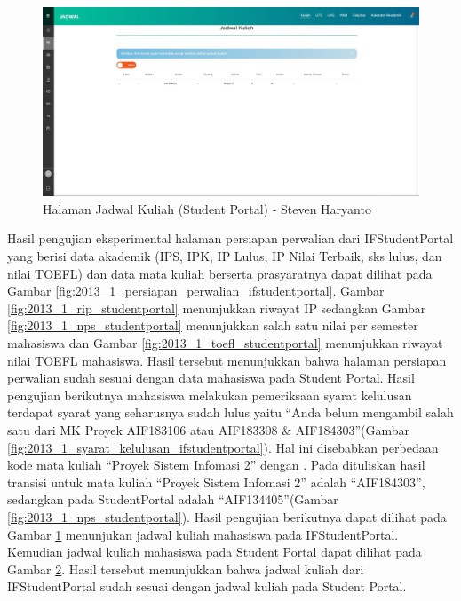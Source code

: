 \begin{itemize}
\begin{enumerate}
\begin{figure}[H]
			\label{fig:2013_1_jadwal_kuliah_ifstudentportal}
		\end{figure}
		\begin{figure}[H]
			\centering
			\includegraphics[scale=0.325]{Gambar/HasilPengujian/2013_1_jadwal_kuliah_studentportal}
			\caption{Halaman Jadwal Kuliah (Student Portal) - Steven Haryanto}
			\label{fig:2013_1_jadwal_kuliah_studentportal}
		\end{figure}
			Hasil pengujian eksperimental halaman persiapan perwalian dari IFStudentPortal yang berisi data akademik (IPS, IPK, IP Lulus, IP Nilai Terbaik, sks lulus, dan nilai TOEFL) dan data mata kuliah berserta prasyaratnya dapat dilihat pada Gambar \ref{fig:2013_1_persiapan_perwalian_ifstudentportal}. Gambar \ref{fig:2013_1_rip_studentportal} menunjukkan riwayat IP sedangkan Gambar \ref{fig:2013_1_nps_studentportal} menunjukkan salah satu nilai per semester mahasiswa dan Gambar \ref{fig:2013_1_toefl_studentportal} menunjukkan riwayat nilai TOEFL mahasiswa. Hasil tersebut menunjukkan bahwa halaman persiapan perwalian sudah sesuai dengan data mahasiswa pada Student Portal. Hasil pengujian berikutnya mahasiswa melakukan pemeriksaan syarat kelulusan terdapat syarat yang seharusnya sudah lulus yaitu ``Anda belum mengambil salah satu dari MK Proyek AIF183106 atau AIF183308 \& AIF184303''(Gambar \ref{fig:2013_1_syarat_kelulusan_ifstudentportal}). Hal ini disebabkan perbedaan kode mata kuliah ``Proyek Sistem Infomasi 2'' dengan \cite{dokumenkurikulum2018}. Pada \cite{dokumenkurikulum2018} dituliskan hasil transisi untuk mata kuliah ``Proyek Sistem Infomasi 2'' adalah ``AIF184303'', sedangkan pada StudentPortal adalah ``AIF134405''(Gambar \ref{fig:2013_1_nps_studentportal}). Hasil pengujian berikutnya dapat dilihat pada Gambar \ref{fig:2013_1_jadwal_kuliah_ifstudentportal} menunjukan jadwal kuliah mahasiswa pada IFStudentPortal. Kemudian jadwal kuliah mahasiswa pada Student Portal dapat dilihat pada Gambar \ref{fig:2013_1_jadwal_kuliah_studentportal}. Hasil tersebut menunjukkan bahwa jadwal kuliah dari IFStudentPortal sudah sesuai dengan jadwal kuliah pada Student Portal.

\end{enumerate}
\end{itemize}
